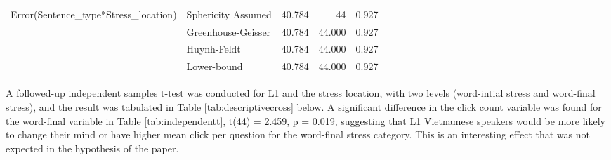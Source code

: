 \documentclass[a4paper]{article}
\begin{document}
\begin{table}[H]
\begin{center}
\begin{tabular}{p{}p{}|l|r|r|r|r|r|}
\hline
\multirow{4}{*}{Error(Sentence\_type*Stress\_location)} & Sphericity Assumed & 40.784                                       & 44                      & 0.927                            & \multicolumn{1}{l|}{~} & \multicolumn{1}{l|}{~}     \\ 
\cline{2-7}
                                                        & Greenhouse-Geisser & 40.784                                       & 44.000                  & 0.927                            & \multicolumn{1}{l|}{~} & \multicolumn{1}{l|}{~}     \\ 
\cline{2-7}
                                                        & Huynh-Feldt        & 40.784                                       & 44.000                  & 0.927                            & \multicolumn{1}{l|}{~} & \multicolumn{1}{l|}{~}     \\ 
\cline{2-7}
                                                        & Lower-bound        & 40.784                                       & 44.000                  & 0.927                            & \multicolumn{1}{l|}{~} & \multicolumn{1}{l|}{~}     \\
\hline
\end{tabular}
\end{center}
\end{table} 


A followed-up independent samples t-test was conducted for L1 and the stress location, with two levels (word-intial stress and word-final stress), and the result was tabulated in Table \ref{tab:descriptivecross} below. A significant difference in the click count variable was found for the word-final variable in Table \ref{tab:independentt}, t(44) = 2.459,  p = 0.019, suggesting that L1 Vietnamese speakers would be more likely to change their mind or have higher mean click per question for the word-final stress category. This is an interesting effect that was not expected in the hypothesis of the paper.
\end{document}
